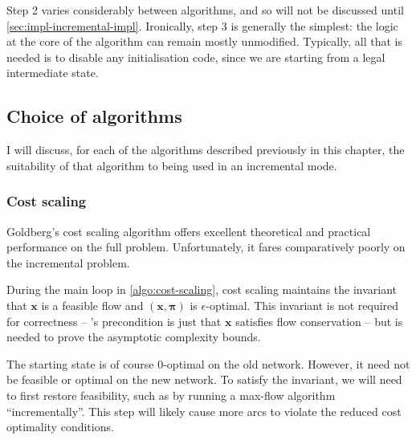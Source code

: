 Step 2 varies considerably between algorithms, and so will not be discussed until \cref{sec:impl-incremental-impl}. Ironically, step 3 is generally the simplest: the logic at the core of the algorithm can remain mostly unmodified. Typically, all that is needed is to disable any initialisation code, since we are starting from a legal intermediate state.


\subsection{Choice of algorithms}
I will discuss, for each of the algorithms described previously in this chapter, the suitability of that algorithm to being used in an incremental mode.

\subsubsection{Cost scaling} 
Goldberg's cost scaling algorithm offers excellent theoretical and practical performance on the full problem. Unfortunately, it fares comparatively poorly on the incremental problem. 

During the main loop in \cref{algo:cost-scaling}, cost scaling maintains the invariant that $\mathbf{x}$ is a feasible flow and $\left(\mathbf{x},\boldsymbol{\pi}\right)$ is $\epsilon$-optimal. This invariant is not required for correctness -- 's precondition is just that $\mathbf{x}$ satisfies flow conservation -- but is needed to prove the asymptotic complexity bounds.

The starting state is of course $0$-optimal on the old network. However, it need not be feasible or optimal on the new network. To satisfy the invariant, we will need to first restore feasibility, such as by running a max-flow algorithm ``incrementally''\footnotemark. This step will likely cause more arcs to violate the reduced cost optimality conditions.

